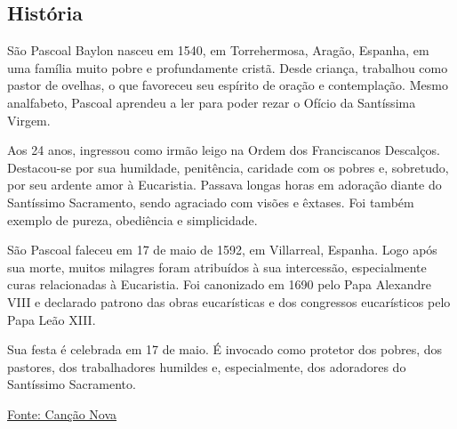 \documentclass[18pt]{article}
\begin{document}
\begin{justify}
\begin{center}
\section{História}\label{sec:História}
\end{center}

São Pascoal Baylon nasceu em 1540, em Torrehermosa, Aragão, Espanha, em uma família muito pobre e profundamente cristã. Desde criança, trabalhou como pastor de ovelhas, o que favoreceu seu espírito de oração e contemplação. Mesmo analfabeto, Pascoal aprendeu a ler para poder rezar o Ofício da Santíssima Virgem.

Aos 24 anos, ingressou como irmão leigo na Ordem dos Franciscanos Descalços. Destacou-se por sua humildade, penitência, caridade com os pobres e, sobretudo, por seu ardente amor à Eucaristia. Passava longas horas em adoração diante do Santíssimo Sacramento, sendo agraciado com visões e êxtases. Foi também exemplo de pureza, obediência e simplicidade.

São Pascoal faleceu em 17 de maio de 1592, em Villarreal, Espanha. Logo após sua morte, muitos milagres foram atribuídos à sua intercessão, especialmente curas relacionadas à Eucaristia. Foi canonizado em 1690 pelo Papa Alexandre VIII e declarado patrono das obras eucarísticas e dos congressos eucarísticos pelo Papa Leão XIII.

Sua festa é celebrada em 17 de maio. É invocado como protetor dos pobres, dos pastores, dos trabalhadores humildes e, especialmente, dos adoradores do Santíssimo Sacramento.

\vfill

\begin{center}
\href{https://santo.cancaonova.com/santo/sao-pascoal-baylon/}{Fonte: Canção Nova}
\end{center}
\end{justify}


\newpage
\end{document}
